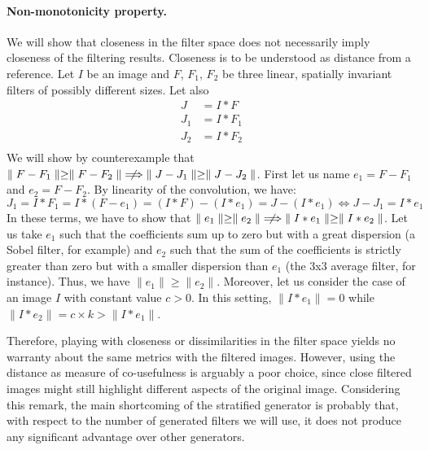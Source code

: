 \documentclass[a4paper]{report}
\begin{document}
			\paragraph{Non-monotonicity property.}
			We will show that closeness in the filter space does not necessarily imply closeness of the filtering results. Closeness is to be understood as distance from a reference.
			Let $I$ be an image and $F$, $F_1$, $F_2$ be three linear, spatially invariant filters of possibly different sizes. Let also
			\begin{align*}
				J &= I * F \\
				J_1 &= I * F_1 \\
				J_2 &= I * F_2 \\
			\end{align*}
			We will show by counterexample that $\parallel F - F_1 \parallel \geq \parallel F - F_2 \parallel \centernot\implies \parallel J - J_1 \parallel \geq \parallel J - J_2 \parallel$.
			First let us name $e_1 = F - F_1$ and $e_2 = F - F_2$. By linearity of the convolution, we have:
			\[
				J_1 = I * F_1 =  I * (F - e_1) = (I * F) - (I * e_1) = J - (I * e_1)
				\iff
				J - J_1 = I * e_1
			\]
			In these terms, we have to show that $\parallel e_1 \parallel \geq \parallel e_2 \parallel \centernot\implies \parallel I * e_1 \parallel \geq \parallel I * e_2 \parallel$. 
			Let us take $e_1$ such that the coefficients sum up to zero but with a great dispersion (a Sobel filter, for example) and $e_2$ such that the sum of the coefficients is strictly greater than zero but with a smaller dispersion than $e_1$ (the 3x3 average filter, for instance). Thus, we have  $\parallel e_1 \parallel \geq \parallel e_2 \parallel$. Moreover, let us consider the case of an image $I$ with constant value $c > 0$. In this setting, $\parallel I * e_1 \parallel = 0$ while $\parallel I * e_2 \parallel = c \times k > \parallel I * e_1 \parallel$.
			\par
			Therefore, playing with closeness or dissimilarities in the filter space yields no warranty about the same metrics with the filtered images. However, using the distance as measure of co-usefulness is arguably a poor choice, since close filtered images might still highlight different aspects of the original image. Considering this remark, the main shortcoming of the stratified generator is probably that, with respect to the number of generated filters we will use, it  does not produce any significant advantage over other generators.
			
			
\end{document}
